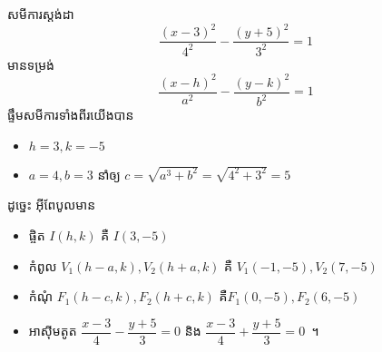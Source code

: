 \begin{answer}
	សមីការស្ដង់ដា
	\begin{equation*}
		\dfrac{(x-3)^2}{4^2}-\dfrac{(y+5)^2}{3^2}=1
	\end{equation*}
	មានទម្រង់
	\begin{equation*}
	\dfrac{(x-h)^2}{a^2}-\dfrac{(y-k)^2}{b^2}=1
	\end{equation*}
	ផ្ទឹមសមីការទាំងពីរយើងបាន
	\begin{itemize}
		\item $ h=3,k=-5 $
		\item $ a=4,b=3 $ នាំឲ្យ $ c=\sqrt{a^3+b^2}=\sqrt{4^2+3^2}=5 $
	\end{itemize}
	ដូច្នេះ អ៊ីពែបូលមាន
	\begin{itemize}
		\item ផ្ចិត $ I(h,k) $ គឺ $ I(3,-5) $
		\item កំពូល $ V_1(h-a,k),V_2(h+a,k) $ គឺ $ V_1(-1,-5),V_2(7,-5) $
		\item កំណុំ $ F_1(h-c,k),F_2(h+c,k) $ គឺ​ $ F_1(0,-5),F_2(6,-5) $
		\item អាស៊ីមតូត $ \dfrac{x-3}{4}-\dfrac{y+5}{3}=0 $ និង $ \dfrac{x-3}{4}+\dfrac{y+5}{3}=0 $~។
	\end{itemize}
\end{answer}
%
